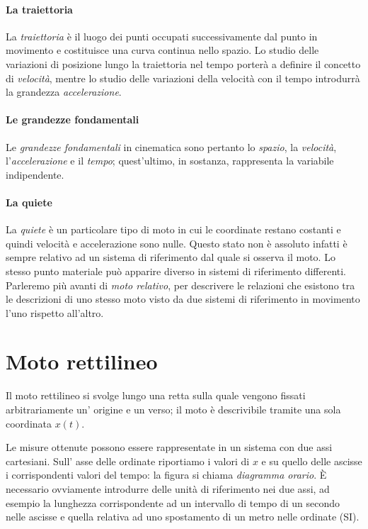 \documentclass[class=book, crop=false, oneside, 12pt]{standalone}
\begin{document}
\paragraph{La traiettoria}
La \emph{traiettoria} è il luogo dei punti occupati successivamente dal punto
in movimento e costituisce una curva continua nello spazio. Lo studio
delle variazioni di posizione lungo la traiettoria nel tempo porterà a
definire il concetto di \emph{velocità}, mentre lo studio delle
variazioni della velocità con il tempo introdurrà la grandezza
\emph{accelerazione}.

\paragraph{Le grandezze fondamentali}
Le \emph{grandezze fondamentali} in cinematica sono pertanto lo
\emph{spazio}, la \emph{velocità}, l'\emph{accelerazione} e il
\emph{tempo}; quest'ultimo, in sostanza, rappresenta la variabile
indipendente.

\paragraph{La quiete}
La \emph{quiete} è un particolare tipo di moto in cui le coordinate
restano costanti e quindi velocità e accelerazione sono nulle. Questo
stato non è assoluto infatti è sempre relativo ad un sistema di
riferimento dal quale si osserva il moto. Lo stesso punto materiale può
apparire diverso in sistemi di riferimento differenti. Parleremo più
avanti di \emph{moto relativo}, per descrivere le relazioni che esistono
tra le descrizioni di uno stesso moto visto da due sistemi di
riferimento in movimento l'uno rispetto all'altro.


\section{Moto rettilineo}
Il moto rettilineo si svolge lungo una retta sulla quale vengono fissati
arbitrariamente un' origine e un verso; il moto è descrivibile tramite
una sola coordinata \(x(t)\).

Le misure ottenute possono essere rappresentate in un sistema con due
assi cartesiani. Sull' asse delle ordinate riportiamo i valori di \(x\)
e su quello delle ascisse i corrispondenti valori del tempo: la figura
si chiama \emph{diagramma orario}. È necessario ovviamente introdurre
delle unità di riferimento nei due assi, ad esempio la lunghezza
corrispondente ad un intervallo di tempo di un secondo nelle ascisse e
quella relativa ad uno spostamento di un metro nelle ordinate (SI).
\end{document}
